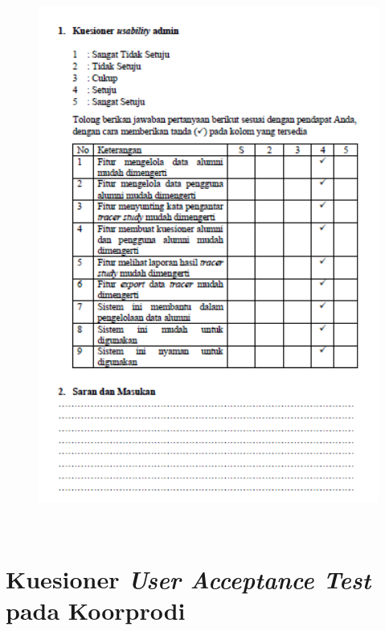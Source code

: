 \begin{figure}[H]
	\centering
	\includegraphics[width=15cm,height=18cm]{gambar/UAT/ku_admin}
	\label{ku_admin}
\end{figure}


\chapter{Kuesioner \textit{User Acceptance Test} pada Koorprodi}

